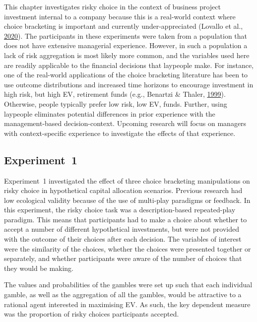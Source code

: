 \documentclass[
  english,
  man, donotrepeattitle,floatsintext]{apa7}
\theoremstyle{definition}
\theoremstyle{definition}
\theoremstyle{definition}
\theoremstyle{definition}
\theoremstyle{remark}
\begin{document}
This chapter investigates risky choice in the context of business project
investment internal to a company because this is a real-world context where
choice bracketing is important and currently under-appreciated (Lovallo et al., \protect\hyperlink{ref-lovallo2020}{2020}).
The participants in these experiments were taken from a population that does not
have extensive managerial experience. However, in such a population a lack of
risk aggregation is most likely more common, and the variables used here are
readily applicable to the financial decisions that laypeople make. For instance,
one of the real-world applications of the choice bracketing literature has been
to use outcome distributions and increased time horizons to encourage investment
in high risk, but high EV, retirement funds (e.g., Benartzi \& Thaler, \protect\hyperlink{ref-benartzi1999}{1999}). Otherwise,
people typically prefer low risk, low EV, funds. Further, using laypeople
eliminates potential differences in prior experience with the management-based
decision-context. Upcoming research will focus on managers with context-specific
experience to investigate the effects of that experience.

\hypertarget{aggregation-1}{%
\subsection{Experiment~1}\label{aggregation-1}}

Experiment~1 investigated the effect of three choice bracketing manipulations on
risky choice in hypothetical capital allocation scenarios. Previous research
had low ecological validity because of the use of multi-play paradigms or
feedback. In this experiment, the risky choice task was a description-based
repeated-play paradigm. This means that participants had to make a choice about
whether to accept a number of different hypothetical investments, but were not
provided with the outcome of their choices after each decision. The variables of
interest were the similarity of the choices, whether the choices were presented
together or separately, and whether participants were aware of the number of
choices that they would be making.

The values and probabilities of the gambles were set up such that each
individual gamble, as well as the aggregation of all the gambles, would be
attractive to a rational agent interested in maximising EV. As such, the key
dependent measure was the proportion of risky choices participants accepted.
\end{document}
